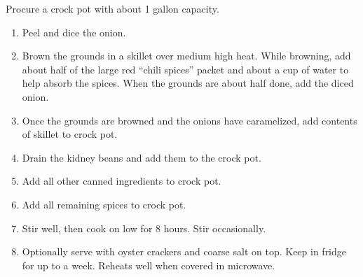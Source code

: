 \instructions
Procure a crock pot with about 1 gallon capacity.
\begin{enumerate}
    \item Peel and dice the onion.
    \item Brown the grounds in a skillet over medium high heat. While browning, add about half of the large red ``chili spices'' packet and about a cup of water to help absorb the spices. When the grounds are about half done, add the diced onion.
    \item Once the grounds are browned and the onions have caramelized, add contents of skillet to crock pot.
    \item Drain the kidney beans and add them to the crock pot.
    \item Add all other canned ingredients to crock pot.
    \item Add all remaining spices to crock pot.
    \item Stir well, then cook on low for 8 hours. Stir occasionally.
    \item Optionally serve with oyster crackers and coarse salt on top. Keep in fridge for up to a week. Reheats well when covered in microwave.
\end{enumerate}
\renewcommand{\thefootnote}{\arabic{footnote}}
\spewfootnotes


